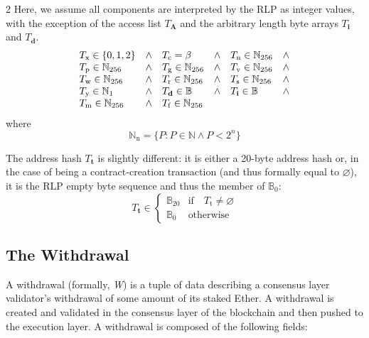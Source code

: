 \documentclass[9pt,oneside]{amsart}
\makeatletter
\newcommand{\linkdest}[1]{\Hy@raisedlink{\hypertarget{#1}{}}}
\makeatother
\begin{document}
\begin{multicols}{2}
Here, we assume all components are interpreted by the RLP as integer values, with the exception of the access list $T_{\mathbf{A}}$ and the arbitrary length byte arrays $T_{\mathbf{i}}$ and $T_{\mathbf{d}}$.
\begin{equation}
\begin{array}[t]{lclclc}
T_{\mathrm{x}} \in \{0, 1, 2\} & \wedge & T_{\mathrm{c}} = \beta & \wedge & T_{\mathrm{n}} \in \mathbb{N}_{256} & \wedge \\
T_{\mathrm{p}} \in \mathbb{N}_{256} & \wedge & T_{\mathrm{g}} \in \mathbb{N}_{256} & \wedge & T_{\mathrm{v}} \in \mathbb{N}_{256} & \wedge \\
T_{\mathrm{w}} \in \mathbb{N}_{256} & \wedge & T_{\mathrm{r}} \in \mathbb{N}_{256} & \wedge & T_{\mathrm{s}} \in \mathbb{N}_{256} & \wedge \\
T_{\mathrm{y}} \in \mathbb{N}_{1} & \wedge & T_{\mathbf{d}} \in \mathbb{B} & \wedge & T_{\mathbf{i}} \in \mathbb{B} & \wedge \\
T_{\mathrm{m}} \in \mathbb{N}_{256} & \wedge & T_{\mathrm{f}} \in \mathbb{N}_{256}
\end{array}
\end{equation}
where
\begin{equation}
\mathbb{N}_{\mathrm{n}} = \{ P: P \in \mathbb{N} \wedge P < 2^n \}
\end{equation}

The address hash $T_{\mathbf{t}}$ is slightly different: it is either a 20-byte address hash or, in the case of being a contract-creation transaction (and thus formally equal to $\varnothing$), it is the RLP empty byte sequence and thus the member of $\mathbb{B}_0$:
\begin{equation}
T_{\mathbf{t}} \in \begin{cases} \mathbb{B}_{20} & \text{if} \quad T_{\mathrm{t}} \neq \varnothing \\
\mathbb{B}_{0} & \text{otherwise}\end{cases}
\end{equation}

\subsection{The Withdrawal}\linkdest{withdrawal}\label{subsec:The_Withdrawal}
A withdrawal (formally, \textit{W}) is a tuple of data describing a consensus layer validator's withdrawal of some amount of its staked Ether.
A withdrawal is created and validated in the consensus layer of the blockchain and then pushed to the execution layer.
A withdrawal is composed of the following fields:


\end{multicols}
\end{document}
